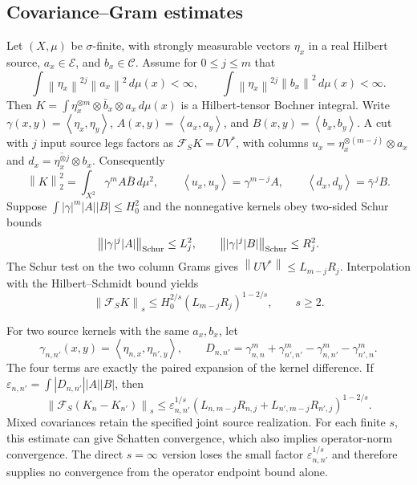 \documentclass[11pt,a4paper]{amsart}
\numberwithin{equation}{section}
\theoremstyle{definition}
\theoremstyle{remark}
\newcommand{\cC}{\mathcal C}
\newcommand{\cE}{\mathcal E}
\newcommand{\Flat}{\mathcal F}
\newcommand{\norm}[1]{\left\lVert#1\right\rVert}
\newcommand{\ip}[2]{\left\langle#1,#2\right\rangle}
\begin{document}
\subsection{Covariance--Gram estimates}
Let $(X,\mu)$ be $\sigma$-finite, with strongly measurable vectors $\eta_x$ in a real Hilbert source, $a_x\in\cE$, and $b_x\in\cC$. Assume for $0\le j\le m$ that
\[
 \int\norm{\eta_x}^{2j}\norm{a_x}^2\,d\mu(x)<\infty,
 \qquad
 \int\norm{\eta_x}^{2j}\norm{b_x}^2\,d\mu(x)<\infty.
\]
Then $K=\int\eta_x^{\otimes m}\otimes\bar b_x\otimes a_x\,d\mu(x)$ is a Hilbert-tensor Bochner integral. Write
$\gamma(x,y)=\ip{\eta_x}{\eta_y}$,
$A(x,y)=\ip{a_x}{a_y}$, and $B(x,y)=\ip{b_x}{b_y}$.
A cut with $j$ input source legs factors as $\Flat_SK=UV^*$, with columns
$u_x=\eta_x^{\otimes(m-j)}\otimes a_x$ and
$d_x=\overline{\eta_x^{\otimes j}}\otimes b_x$.
Consequently
\begin{equation}\label{eq:covgram}
 \norm K_2^2=\int_{X^2}\gamma^m A\bar B\,d\mu^2,
 \qquad \ip{u_x}{u_y}=\gamma^{m-j}A,
 \qquad \ip{d_x}{d_y}=\bar\gamma^{\,j}B.
\end{equation}
Suppose $\int|\gamma|^m|A||B|\le H_0^2$ and the nonnegative kernels obey two-sided Schur bounds
\[
 \norm{|\gamma|^j|A|}_{\rm Schur}\le L_j^2,
 \qquad \norm{|\gamma|^j|B|}_{\rm Schur}\le R_j^2.
\]
The Schur test on the two column Grams gives $\norm{UV^*}\le L_{m-j}R_j$. Interpolation with the Hilbert--Schmidt bound yields
\begin{equation}\label{eq:covcut}
 \norm{\Flat_SK}_s\le H_0^{2/s}(L_{m-j}R_j)^{1-2/s},\qquad s\ge2.
\end{equation}

For two source kernels with the same $a_x,b_x$, let
\[
 \gamma_{n,n'}(x,y)=\ip{\eta_{n,x}}{\eta_{n',y}},\qquad
 D_{n,n'}=\gamma_{n,n}^m+\gamma_{n',n'}^m-\gamma_{n,n'}^m-\gamma_{n',n}^m.
\]
The four terms are exactly the paired expansion of the kernel difference. If $\varepsilon_{n,n'}=\int|D_{n,n'}||A||B|$, then
\begin{equation}\label{eq:covcutdiff}
 \norm{\Flat_S(K_n-K_{n'})}_s
 \le\varepsilon_{n,n'}^{1/s}
 (L_{n,m-j}R_{n,j}+L_{n',m-j}R_{n',j})^{1-2/s}.
\end{equation}
Mixed covariances retain the specified joint source realization. For each finite $s$, this estimate can give Schatten convergence, which also implies operator-norm convergence. The direct $s=\infty$ version loses the small factor $\varepsilon_{n,n'}^{1/s}$ and therefore supplies no convergence from the operator endpoint bound alone.
\end{document}
